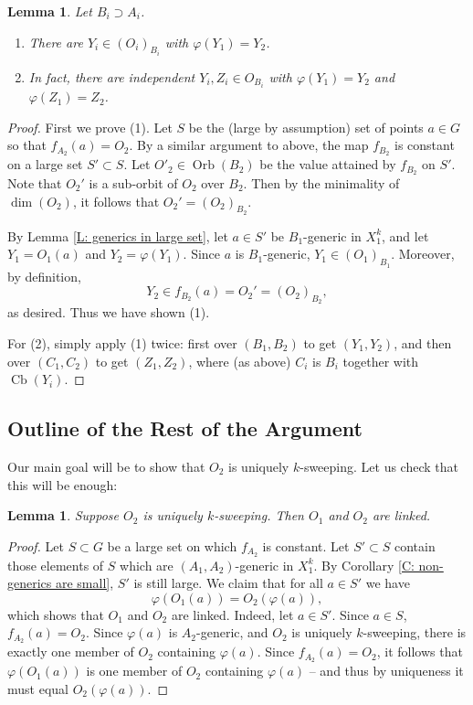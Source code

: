 \documentclass{amsart}
\newtheorem{lemma}[theorem]{Lemma}
\theoremstyle{definition}
\begin{document}
    \begin{lemma}\label{L: weakly linked}
        Let $B_i\supset A_i$.
        \begin{enumerate}
            \item There are $Y_i\in(O_i)_{B_i}$ with $\varphi(Y_1)=Y_2$.
            \item In fact, there are independent $Y_i,Z_i\in O_{B_i}$ with $\varphi(Y_1)=Y_2$ and $\varphi(Z_1)=Z_2$.
        \end{enumerate}
    \end{lemma}
    \begin{proof} First we prove (1). Let $S$ be the (large by assumption) set of points $a\in G$ so that $f_{A_2}(a)=O_2$. By a similar argument to above, the map $f_{B_2}$ is constant on a large set $S'\subset S$. Let $O'_2\in\operatorname{Orb}(B_2)$ be the value attained by $f_{B_2}$ on $S'$. Note that $O_2'$ is a sub-orbit of $O_2$ over $B_2$. Then by the minimality of $\dim(O_2)$, it follows that $O_2'=(O_2)_{B_2}$.
    
    By Lemma \ref{L: generics in large set}, let $a\in S'$ be $B_1$-generic in $X_1^k$, and let $Y_1=O_1(a)$ and $Y_2=\varphi(Y_1)$. Since $a$ is $B_1$-generic, $Y_1\in(O_1)_{B_1}$. Moreover, by definition, $$Y_2\in f_{B_2}(a)=O_2'=(O_2)_{B_2},$$ as desired. Thus we have shown (1).

    For (2), simply apply (1) twice: first over $(B_1,B_2)$ to get $(Y_1,Y_2)$, and then over $(C_1,C_2)$ to get $(Z_1,Z_2)$, where (as above) $C_i$ is $B_i$ together with $\operatorname{Cb}(Y_i)$.
    \end{proof}

    \subsection{Outline of the Rest of the Argument}

    Our main goal will be to show that $O_2$ is uniquely $k$-sweeping. Let us check that this will be enough:

    \begin{lemma}\label{L: weakly linked implies linked}
        Suppose $O_2$ is uniquely $k$-sweeping. Then $O_1$ and $O_2$ are linked.
    \end{lemma}
    \begin{proof}
        Let $S\subset G$ be a large set on which $f_{A_2}$ is constant. Let $S'\subset S$ contain those elements of $S$ which are $(A_1,A_2)$-generic in $X_1^k$. By Corollary \ref{C: non-generics are small}, $S'$ is still large. We claim that for all $a\in S'$ we have $$\varphi(O_1(a))=O_2(\varphi(a)),$$ which shows that $O_1$ and $O_2$ are linked. Indeed, let $a\in S'$. Since $a\in S$, $f_{A_2}(a)=O_2$. Since $\varphi(a)$ is $A_2$-generic, and $O_2$ is uniquely $k$-sweeping, there is exactly one member of $O_2$ containing $\varphi(a)$. Since $f_{A_2}(a)=O_2$, it follows that $\varphi(O_1(a))$ is one member of $O_2$ containing $\varphi(a)$ -- and thus by uniqueness it must equal $O_2(\varphi(a))$.
    \end{proof}
\end{document}
